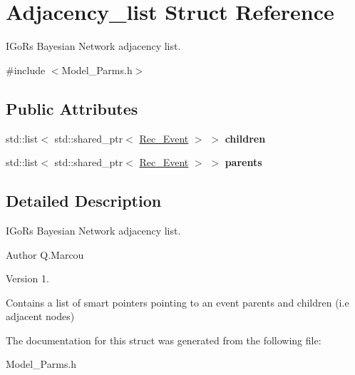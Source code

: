 \hypertarget{structAdjacency__list}{}\section{Adjacency\+\_\+list Struct Reference}
\label{structAdjacency__list}


I\+GoR\textquotesingle{}s Bayesian Network adjacency list.  




{\ttfamily \#include $<$Model\+\_\+\+Parms.\+h$>$}

\subsection*{Public Attributes}
\begin{DoxyCompactItemize}
\item 
\mbox{\label{structAdjacency__list_aedd49ef5cbfa19a62a35d2e25b6c4a6b}} 
std\+::list$<$ std\+::shared\+\_\+ptr$<$ \hyperlink{classRec__Event}{Rec\+\_\+\+Event} $>$ $>$ {\bfseries children}
\item 
\mbox{\label{structAdjacency__list_afaa0a99be6d7ccbb76a578bf365c99fc}} 
std\+::list$<$ std\+::shared\+\_\+ptr$<$ \hyperlink{classRec__Event}{Rec\+\_\+\+Event} $>$ $>$ {\bfseries parents}
\end{DoxyCompactItemize}


\subsection{Detailed Description}
I\+GoR\textquotesingle{}s Bayesian Network adjacency list. 

\begin{DoxyAuthor}{Author}
Q.\+Marcou 
\end{DoxyAuthor}
\begin{DoxyVersion}{Version}
1.
\end{DoxyVersion}
Contains a list of smart pointers pointing to an event parents and children (i.\+e adjacent nodes) 

The documentation for this struct was generated from the following file\+:\begin{DoxyCompactItemize}
\item 
Model\+\_\+\+Parms.\+h\end{DoxyCompactItemize}
